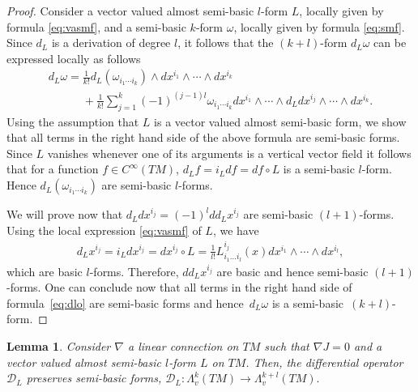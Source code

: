 \documentclass[pdftex]{sigma}
\numberwithin{equation}{section}
\newtheorem{Lemma}[Theorem]{Lemma}
\begin{document}
\begin{proof}
Consider a vector valued almost semi-basic $l$-form $L$, locally given
by formula \eqref{eq:vasmf}, and a semi-basic $k$-form $\omega$, locally given by formula
\eqref{eq:smf}. Since $d_L$ is a derivation of degree $l$, it follows
that the $(k+l)$-form $d_L\omega$ can be
expressed locally as follows
\begin{gather}
\nonumber d_L\omega  =  \frac{1}{k!}d_L(\omega_{i_1\cdots
  i_k})\wedge  dx^{i_1}\wedge \cdots \wedge dx^{i_k}  \\[-0.5ex]
 \phantom{d_L\omega  =}{}  +  \frac{1}{k!}
\sum^k_{j=1}(-1)^{(j-1)l} \omega_{i_1\cdots
  i_k} dx^{i_1}\wedge \cdots \wedge d_Ldx^{i_j} \wedge \cdots \wedge
dx^{i_k}. \label{eq:dlo}
\end{gather}
Using the assumption that $L$ is a vector valued almost semi-basic
form, we show that all terms in the right hand side of the above formula
are semi-basic forms. Since $L$ vanishes whenever one of its arguments
is a vertical vector f\/ield it follows that for a function $f\in C^{\infty}(TM)$, $d_Lf=i_Ldf=df\circ
L$ is a semi-basic $l$-form. Hence $d_L(\omega_{i_1\cdots i_k})$ are semi-basic $l$-forms.

We will prove now that $d_Ldx^{i_j}=(-1)^ldd_Lx^{i_j} $ are semi-basic
$(l+1)$-forms. Using the local expression \eqref{eq:vasmf} of $L$, we have
\begin{gather*} d_Lx^{i_j}=i_Ldx^{i_j} = dx^{i_j}\circ L =\frac{1}{l!}
L^{i_j}_{i_1\dots i_l}(x) dx^{i_1}\wedge \cdots \wedge
dx^{i_l},%
\end{gather*}
which are basic $l$-forms. Therefore, $dd_Lx^{i_j}$ are basic and hence
semi-basic $(l+1)$-forms.
One can conclude now that all terms in the right hand side of formula~\eqref{eq:dlo} are
semi-basic forms and hence~$d_L\omega$ is a semi-basic~$(k+l)$-form.
\end{proof}

\begin{Lemma} \label{lem:nablaomega} Consider $\nabla$ a linear connection on $TM$ such
that $\nabla J=0$ and a vector valued almost semi-basic $l$-form
$L$ on $TM$. Then, the differential operator ${\mathcal D}_L$
preserves semi-basic forms, ${\mathcal D}_L: \Lambda^k_v(TM) \to
\Lambda^{k+l}_v(TM).$
\end{Lemma}
\end{document}
